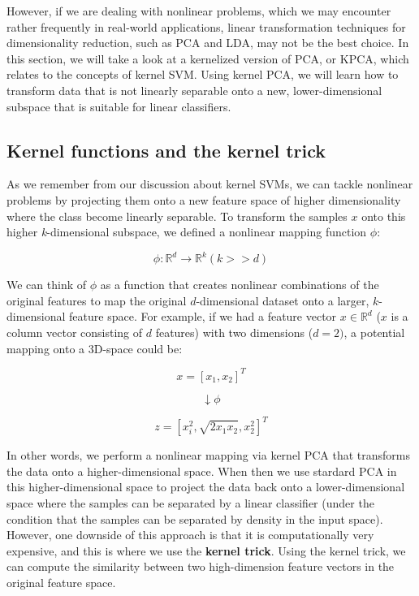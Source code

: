 \documentclass[11pt]{article}
\begin{document}
However, if we are dealing with nonlinear problems, which we may
encounter rather frequently in real-world applications, linear
transformation techniques for dimensionality reduction, such as PCA and
LDA, may not be the best choice. In this section, we will take a look at
a kernelized version of PCA, or KPCA, which relates to the concepts of
kernel SVM. Using kernel PCA, we will learn how to transform data that
is not linearly separable onto a new, lower-dimensional subspace that is
suitable for linear classifiers.

    \subsection{Kernel functions and the kernel
trick}\label{kernel-functions-and-the-kernel-trick}

    As we remember from our discussion about kernel SVMs, we can tackle
nonlinear problems by projecting them onto a new feature space of higher
dimensionality where the class become linearly separable. To transform
the samples \(x\) onto this higher \emph{k}-dimensional subspace, we
defined a nonlinear mapping function \(\phi\):

\[\phi : \mathbb{R}^d \rightarrow \mathbb{R}^k (k >> d)\]

We can think of \(\phi\) as a function that creates nonlinear
combinations of the original features to map the original
\(d\)-dimensional dataset onto a larger, \(k\)-dimensional feature
space. For example, if we had a feature vector \(x \in \mathbb{R}^d\)
(\(x\) is a column vector consisting of \(d\) features) with two
dimensions (\(d=2)\), a potential mapping onto a 3D-space could be:

\[x = [x_1, x_2]^T\]

\[\downarrow \phi\]

\[z = [x_i^2, \sqrt{2x_1x_2}, x_2^2]^T\]

In other words, we perform a nonlinear mapping via kernel PCA that
transforms the data onto a higher-dimensional space. When then we use
stardard PCA in this higher-dimensional space to project the data back
onto a lower-dimensional space where the samples can be separated by a
linear classifier (under the condition that the samples can be separated
by density in the input space). However, one downside of this approach
is that it is computationally very expensive, and this is where we use
the \textbf{kernel trick}. Using the kernel trick, we can compute the
similarity between two high-dimension feature vectors in the original
feature space.
\end{document}
